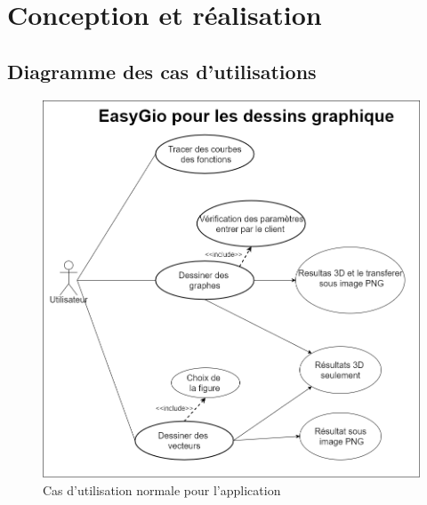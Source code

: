 \documentclass[a4paper]{report}
\begin{document}
\chapter{Conception et réalisation}
\section{Diagramme des cas d'utilisations}
\begin{figure}[!h]
    \centering
    \includegraphics[width=14cm]{images/MY UML.PNG}
    \caption{Cas d'utilisation normale pour l'application}
    \label{fig:Cas d'utilisation normale pour l'application}
\end{figure}
\newpage
\end{document}
